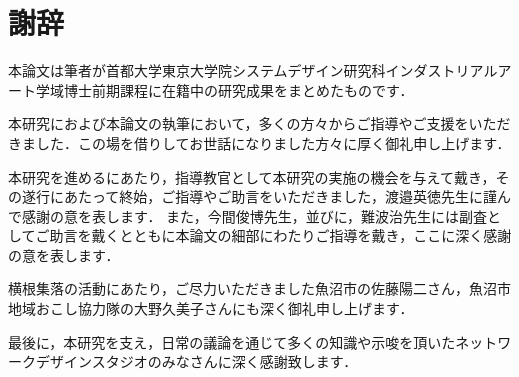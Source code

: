 \documentclass[a4paper]{jsarticle}
\begin{document}
\section*{謝辞}
\par
本論文は筆者が首都大学東京大学院システムデザイン研究科インダストリアルアート学域博士前期課程に在籍中の研究成果をまとめたものです．
\par
本研究におよび本論文の執筆において，多くの方々からご指導やご支援をいただきました．この場を借りしてお世話になりました方々に厚く御礼申し上げます．
\par
本研究を進めるにあたり，指導教官として本研究の実施の機会を与えて戴き，その遂行にあたって終始，ご指導やご助言をいただきました，渡邉英徳先生に謹んで感謝の意を表します．
また，今間俊博先生，並びに，難波治先生には副査としてご助言を戴くとともに本論文の細部にわたりご指導を戴き，ここに深く感謝の意を表します．
\par
横根集落の活動にあたり，ご尽力いただきました魚沼市の佐藤陽二さん，魚沼市地域おこし協力隊の大野久美子さんにも深く御礼申し上げます．
\par
最後に，本研究を支え，日常の議論を通じて多くの知識や示唆を頂いたネットワークデザインスタジオのみなさんに深く感謝致します．
\newpage
\end{document}
